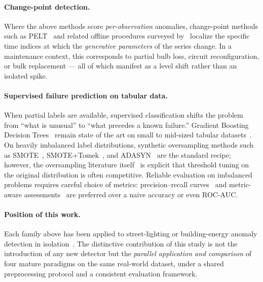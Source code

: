 \documentclass{article}
\begin{document}
\paragraph{Change-point detection.}
Where the above methods score \emph{per-observation} anomalies, change-point methods such as PELT~\cite{killick2012pelt} and related offline procedures surveyed by~\cite{truong2020ruptures,aminikhanghahi2017survey} localize the specific time indices at which the \emph{generative parameters} of the series change. In a maintenance context, this corresponds to partial bulb loss, circuit reconfiguration, or bulk replacement --- all of which manifest as a level shift rather than an isolated spike.

\paragraph{Supervised failure prediction on tabular data.}
When partial labels are available, supervised classification shifts the problem from ``what is unusual'' to ``what precedes a known failure.'' Gradient Boosting Decision Trees~\cite{friedman2001gbm,chen2016xgboost} remain state of the art on small to mid-sized tabular datasets~\cite{shwartz2022tabular}. On heavily imbalanced label distributions, synthetic oversampling methods such as SMOTE~\cite{chawla2002smote}, SMOTE+Tomek~\cite{batista2004study}, and ADASYN~\cite{he2008adasyn} are the standard recipe; however, the oversampling literature itself~\cite{fernandez2018smote} is explicit that threshold tuning on the original distribution is often competitive. Reliable evaluation on imbalanced problems requires careful choice of metrics: precision--recall curves~\cite{saito2015precision} and metric-aware assessments~\cite{hand2009measuring,fawcett2006roc} are preferred over a naive accuracy or even ROC-AUC.

\paragraph{Position of this work.}
Each family above has been applied to street-lighting or building-energy anomaly detection in isolation~\cite{nespoli2024street,ptacek2022road,himeur2021survey,wang2020review}. The distinctive contribution of this study is not the introduction of any new detector but the \emph{parallel application and comparison} of four mature paradigms on the same real-world dataset, under a shared preprocessing protocol and a consistent evaluation framework.

\end{document}
